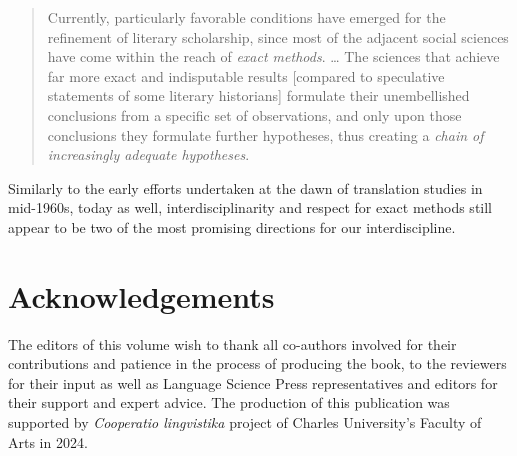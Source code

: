 \documentclass[output=paper]{langscibook}
\begin{document}
\begin{quote}
Currently, particularly favorable conditions have emerged for the refinement of literary scholarship, since most of the adjacent social sciences have come within the reach of \textit{exact methods}. … The sciences that achieve far more exact and indisputable results [compared to speculative statements of some literary historians] formulate their unembellished conclusions from a specific set of observations, and only upon those conclusions they formulate further hypotheses, thus creating a \textit{chain of increasingly adequate hypotheses}. \citep[11, 18, our translation; emphasis added]{Levy1965}
\end{quote}

Similarly to the early efforts undertaken at the dawn of translation studies in mid-1960s, today as well, interdisciplinarity and respect for exact methods still appear to be two of the most promising directions for our interdiscipline.

\section*{Acknowledgements}

The editors of this volume wish to thank all co-authors involved for their contributions and patience in the process of producing the book, to the reviewers for their input as well as Language Science Press representatives and editors for their support and expert advice.
The production of this publication was supported by \textit{Cooperatio lingvistika} project of Charles University’s Faculty of Arts in 2024.

\sloppy\printbibliography[heading=subbibliography,notkeyword=this]
\end{document}
